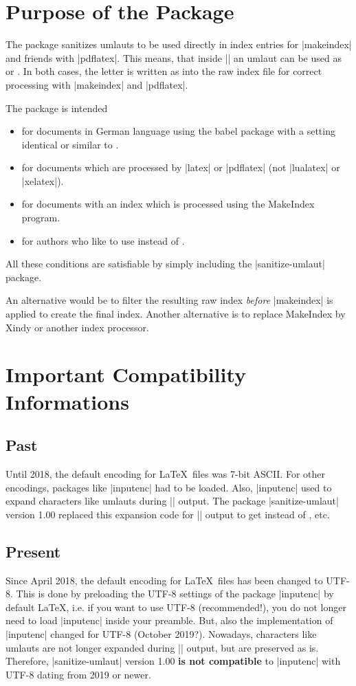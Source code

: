 \documentclass[a4paper,11pt]{ltxdoc}
\begin{document}
\clearpage
\section{Purpose of the Package}%
The package sanitizes umlauts to be used directly in index entries for
|makeindex| and friends with |pdflatex|. This means, that inside |\index| an umlaut can
be used as  or . In both cases, the letter is written
as  into the raw index file for correct processing with |makeindex|
and |pdflatex|.

The package is intended
\begin{itemize}
\item for documents in German language using the babel package with a setting
  identical or similar to \myverb{\usepackage[ngerman]{babel}}.
\item for documents which are processed by |latex| or |pdflatex| (not |lualatex| or |xelatex|).
\item for documents with an index which is processed using the
  MakeIndex program.
\item for authors who like to use  instead of
  .
\end{itemize}

All these conditions are satisfiable by simply including the |sanitize-umlaut|
package.

An alternative would be to filter the resulting raw  index
\emph{before} |makeindex| is applied to create the final  index.
Another alternative is to replace MakeIndex by Xindy or another index
processor.

\clearpage
\section{Important Compatibility Informations}%

\subsection{Past}
Until 2018, the default encoding for \LaTeX\ files was 7-bit ASCII.
For other encodings, packages like |inputenc| had to be loaded.
Also, |inputenc| used to expand characters like umlauts during |\index| output.
The package |sanitize-umlaut| version 1.00 replaced this expansion code
for |\index| output to get  instead of , etc.

\subsection{Present}
Since April 2018, the default encoding for \LaTeX\ files has been changed to UTF-8.
This is done by preloading the UTF-8 settings of the package |inputenc|
by default \LaTeX, i.e. if you want to use UTF-8 (recommended!), you do not
longer need to load |inputenc| inside your preamble.
But, also the implementation of |inputenc| changed for UTF-8 (October 2019?).
Nowadays, characters like umlauts are not longer expanded during |\index| output,
but are preserved as is.
Therefore, |sanitize-umlaut| version 1.00 \textbf{is not compatible} to
|inputenc| with UTF-8 dating from 2019 or newer.
\end{document}
